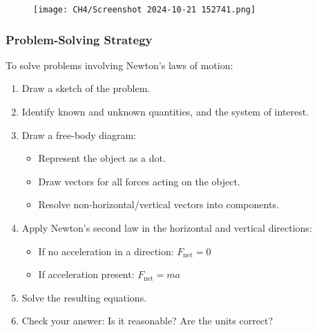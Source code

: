 \documentclass{beamer}
\begin{document}
\begin{frame}
\begin{figure}
    \centering
    \texttt{[image: CH4/Screenshot 2024-10-21 152741.png]}
\end{figure}
\end{frame}

\begin{frame}
\frametitle{Problem-Solving Strategy}
To solve problems involving Newton's laws of motion:
\begin{enumerate}
    \item Draw a sketch of the problem.
    \item Identify known and unknown quantities, and the system of interest.
    \item Draw a free-body diagram:
    \begin{itemize}
        \item Represent the object as a dot.
        \item Draw vectors for all forces acting on the object.
        \item Resolve non-horizontal/vertical vectors into components.
    \end{itemize}
    \item Apply Newton's second law in the horizontal and vertical directions:
    \begin{itemize}
        \item If no acceleration in a direction: $F_{\text{net}} = 0$
        \item If acceleration present: $F_{\text{net}} = ma$
    \end{itemize}
    \item Solve the resulting equations.
    \item Check your answer: Is it reasonable? Are the units correct?
\end{enumerate}
\end{frame}
\end{document}
